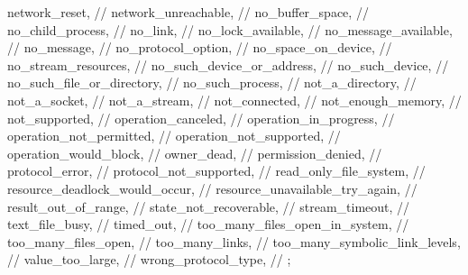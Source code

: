 \begin{codeblock}
{{    network_reset,                      // 
    network_unreachable,                // 
    no_buffer_space,                    // 
    no_child_process,                   // 
    no_link,                            // 
    no_lock_available,                  // 
    no_message_available,               // 
    no_message,                         // 
    no_protocol_option,                 // 
    no_space_on_device,                 // 
    no_stream_resources,                // 
    no_such_device_or_address,          // 
    no_such_device,                     // 
    no_such_file_or_directory,          // 
    no_such_process,                    // 
    not_a_directory,                    // 
    not_a_socket,                       // 
    not_a_stream,                       // 
    not_connected,                      // 
    not_enough_memory,                  // 
    not_supported,                      // 
    operation_canceled,                 // 
    operation_in_progress,              // 
    operation_not_permitted,            // 
    operation_not_supported,            // 
    operation_would_block,              // 
    owner_dead,                         // 
    permission_denied,                  // 
    protocol_error,                     // 
    protocol_not_supported,             // 
    read_only_file_system,              // 
    resource_deadlock_would_occur,      // 
    resource_unavailable_try_again,     // 
    result_out_of_range,                // 
    state_not_recoverable,              // 
    stream_timeout,                     // 
    text_file_busy,                     // 
    timed_out,                          // 
    too_many_files_open_in_system,      // 
    too_many_files_open,                // 
    too_many_links,                     // 
    too_many_symbolic_link_levels,      // 
    value_too_large,                    // 
    wrong_protocol_type,                // 
  };

}
\end{codeblock}
